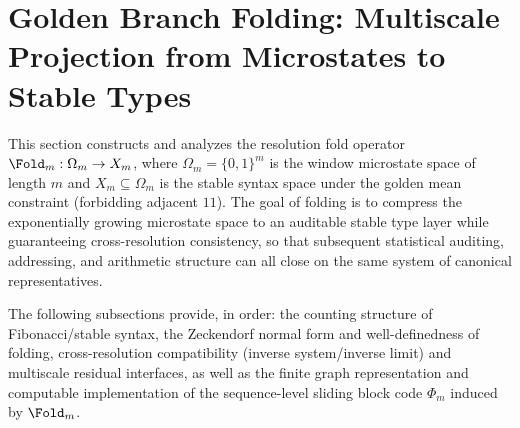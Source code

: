\section{Golden Branch Folding: Multiscale Projection from Microstates to Stable Types}\label{sec:folding}

This section constructs and analyzes the resolution fold operator \(\Fold_m:\Omega_m\to X_m\), where \(\Omega_m=\{0,1\}^m\) is the window microstate space of length \(m\) and \(X_m\subseteq\Omega_m\) is the stable syntax space under the golden mean constraint (forbidding adjacent \(11\)). The goal of folding is to compress the exponentially growing microstate space to an auditable stable type layer while guaranteeing cross-resolution consistency, so that subsequent statistical auditing, addressing, and arithmetic structure can all close on the same system of canonical representatives.\par
The following subsections provide, in order: the counting structure of Fibonacci/stable syntax, the Zeckendorf normal form and well-definedness of folding, cross-resolution compatibility (inverse system/inverse limit) and multiscale residual interfaces, as well as the finite graph representation and computable implementation of the sequence-level sliding block code \(\Phi_m\) induced by \(\Fold_m\).


















